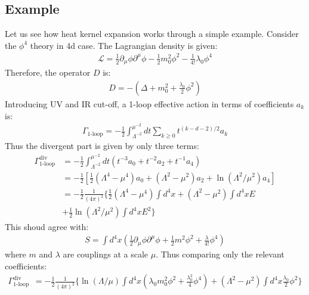 \subsection{Example}
Let us see how heat kernel expansion works through a simple example. Consider the $\phi ^{4}$ theory in 4d case. The Lagrangian density is given:
\begin{align}
    \mathcal{L} = \frac{1}{2} \partial_{\mu} \phi \partial ^{\mu} \phi - \frac{1}{2}m_{0}^{2} \phi^{2} -\frac{1}{4!} \lambda _{0} \phi^4
\end{align}
Therefore, the operator $D$ is:
\begin{align}
    D = -(\Delta + m_{0}^{2} + \frac{\lambda_{0}}{2}\phi ^{2})
\end{align}
Introducing UV and IR cut-off, a 1-loop effective action in terms of coefficients $a_{k}$ is:
\begin{align}
    \Gamma _{\text{1-loop}} = -\frac{1}{2} \int _{\Lambda ^{-2}}^{\mu ^{-2}} dt \sum _{k\ge 0} t^{(k-d-2)/2}a_{k} 
\end{align}
Thus the divergent part is given by only three terms:
\begin{align}
    \Gamma_{\text{1-loop}}^{\text{div}} &= -\frac{1}{2}  \int _{\Lambda ^{-2}}^{\mu ^{-2}} dt (t^{-3} a_{0} + t^{-2} a_{2} + t^{-1} a_{4}) \nonumber \\
    & = -\frac{1}{2} [\frac{1}{2} (\Lambda ^{4} -\mu ^{4}) a_{0} + (\Lambda ^{2} - \mu ^{2}) a_{2} + \ln (\Lambda ^{2}/\mu ^{2}) a_{4}] \nonumber \\
    &= -\frac{1}{2} \frac{1}{(4\pi)^{2}} \lbrace \frac{1}{2} (\Lambda ^{4} - \mu ^{4}) \int d^{4}x + (\Lambda ^{2} - \mu ^{2}) \int d^{4}x E \nonumber \\ 
    &+ \frac{1}{2} \ln (\Lambda ^{2} / \mu ^{2}) \int d^{4}x E^{2} \rbrace 
\end{align}
This shoud agree with:
\begin{align}
    S = \int d^{4}x (\frac{1}{2}\partial _{\mu} \phi \partial ^{\mu} \phi + \frac{1}{2} m^{2} \phi ^{2} + \frac{\lambda}{4!}\phi^{4})
\end{align}
where $m$ and $\lambda$ are couplings at a scale $\mu$.
Thus comparing only the relevant coefficients:
\begin{align}
    \Gamma_{\text{1-loop}}^{\text{div}} &= -\frac{1}{2} \frac{1}{(4\pi)^{2}}  \lbrace \ln(\Lambda/\mu) \int d^{4}x (\lambda _{0} m_{0}^{2} \phi^{2} + \frac{\lambda_{0}^{2}}{4} \phi^{4})  + (\Lambda^{2} - \mu ^{2}) \int d^{4}x\frac{\lambda _{0}}{2} \phi^{2} \rbrace
\end{align}
